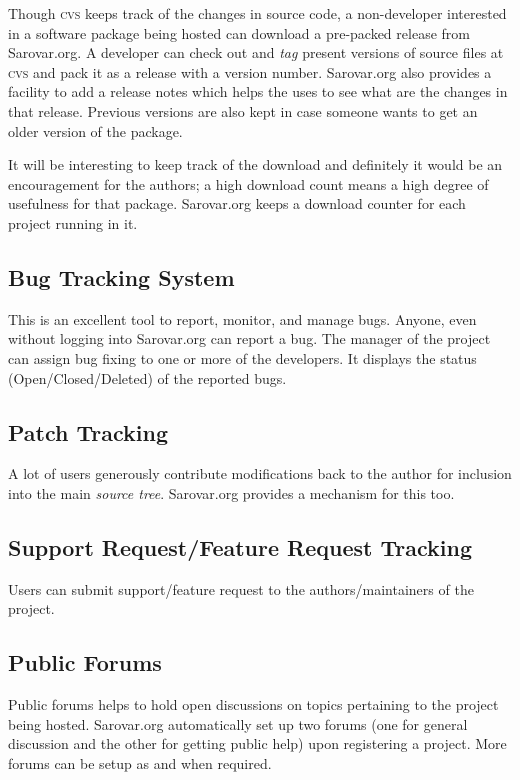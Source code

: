 \documentclass{article}
\begin{document}
Though \textsc{cvs} keeps track of the changes in source code, a
non-developer interested in a software package being hosted can
download a pre-packed release from Sarovar.org. A developer can check
out and {\em tag} present versions of source files at \textsc{cvs} and
pack it as a release with a version number. Sarovar.org also provides
a facility to add a release notes which helps the uses to see what are
the changes in that release. Previous versions are also kept in case
someone wants to get an older version of the package.

It will be interesting to keep track of the download and definitely it
would be an encouragement for the authors; a high download count means
a high degree of usefulness for that package. Sarovar.org keeps a
download counter for each project running in it.

\subsection{Bug Tracking System}

This is an excellent tool to report, monitor, and manage bugs. Anyone,
even without logging into Sarovar.org can report a bug. The manager of
the project can assign bug fixing to one or more of the developers. It
displays the status (Open/Closed/Deleted) of the reported bugs.

\subsection{Patch Tracking}

A lot of users generously contribute modifications back to the author
for inclusion into the main {\em source tree}. Sarovar.org provides a
mechanism for this too.

\subsection{Support Request/Feature Request Tracking}

Users can submit support/feature request to the authors/maintainers of
the project.

\subsection{Public Forums}
Public forums helps to hold open discussions on topics pertaining to
the project being hosted. Sarovar.org automatically set up two forums
(one for general discussion and the other for getting public help)
upon registering a project. More forums can be setup as and when
required.
\end{document}
